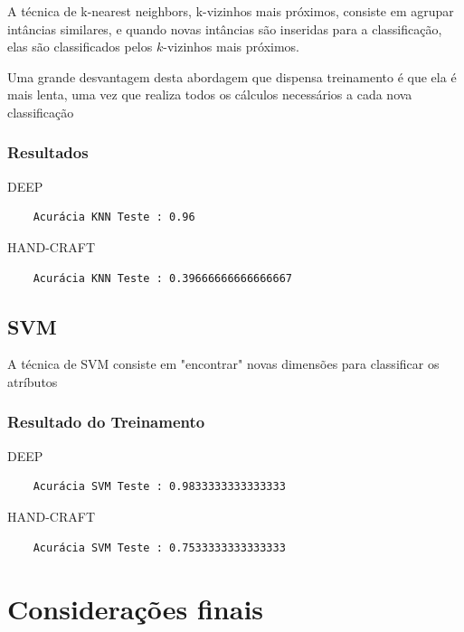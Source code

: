 \documentclass[
article,			%
11pt,				%
oneside,			%
a4paper,			%
english,			%
brazil,				%
sumario=tradicional,
]{abntex2}
\begin{document}
	A técnica de k-nearest neighbors, k-vizinhos mais próximos, consiste em agrupar intâncias similares, e quando novas intâncias são inseridas para a classificação, elas são classificados pelos \(k\)-vizinhos mais próximos.
	
	Uma grande desvantagem desta abordagem que dispensa treinamento é que ela é mais lenta, uma vez que realiza todos os cálculos necessários a cada nova classificação
	
	\subsubsection{Resultados}
	
	DEEP	
	\begin{verbatim}
	Acurácia KNN Teste : 0.96
	\end{verbatim}
	
	HAND-CRAFT
	\begin{verbatim}
	Acurácia KNN Teste : 0.39666666666666667
	\end{verbatim}
	
	
	\subsection{SVM}
	A técnica de SVM consiste em "encontrar" novas dimensões para classificar os atríbutos
	\subsubsection{Resultado do Treinamento}
		
	DEEP	
	\begin{verbatim}
	Acurácia SVM Teste : 0.9833333333333333
	\end{verbatim}
	
	HAND-CRAFT
	\begin{verbatim}
	Acurácia SVM Teste : 0.7533333333333333
	\end{verbatim}
	
	
	\section{Considerações finais}
	
	\lipsum[1]
	
	\begin{citacao}
		\lipsum[2]
	\end{citacao}
	
\end{document}
